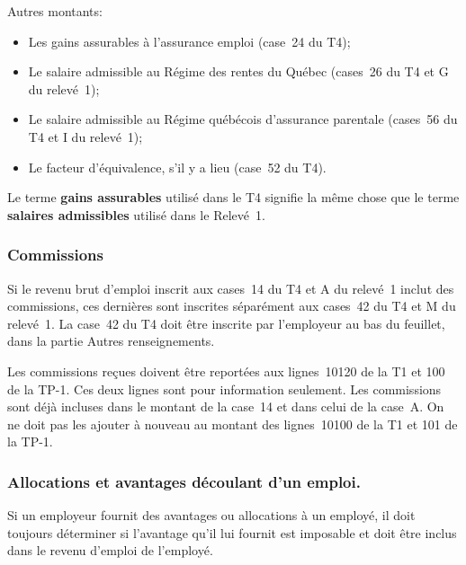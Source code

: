 Autres montants:
\begin{itemize}
	\item Les gains assurables à l'assurance emploi (case~24 du T4);
	\item Le salaire admissible au Régime des rentes du Québec (cases~26 du T4 et G du relevé~1);
	\item Le salaire admissible au Régime québécois d'assurance parentale (cases~56 du T4 et I du relevé~1);
	\item Le facteur d'équivalence, s'il y a lieu (case~52 du T4).
\end{itemize}

Le terme \textbf{gains assurables} utilisé dans le T4 signifie la même chose que le terme \textbf{salaires admissibles} utilisé dans le Relevé~1.

\subsubsection{Commissions}
Si le revenu brut d'emploi inscrit aux cases~14 du T4 et A du relevé~1 inclut des commissions, ces dernières sont inscrites séparément aux cases~42 du T4 et M du relevé~1. La case~42 du T4 doit être inscrite par l'employeur au bas du feuillet, dans la partie \og Autres renseignements\fg{}.

Les commissions reçues doivent être reportées aux lignes~10120 de la T1 et 100 de la TP-1. Ces deux lignes sont pour information seulement.
Les commissions sont déjà incluses dans le montant de la case~14 et dans celui de la case~A. On ne doit pas les ajouter à nouveau au montant des lignes~10100 de la T1 et 101 de la TP-1. 

\subsubsection{Allocations et avantages découlant d'un emploi.}
Si un employeur fournit des avantages ou allocations à un employé, il doit toujours déterminer si l'avantage qu'il lui fournit est imposable et doit être inclus dans le revenu d'emploi de l'employé.

